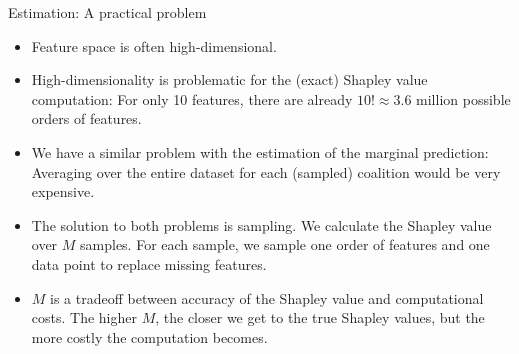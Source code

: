 \documentclass[11pt,compress,t,notes=noshow, aspectratio=169, xcolor=table]{beamer}
\begin{document}
\begin{vbframe}{Estimation: A practical problem}
  \begin{itemize}
  \itemsep1em
      \item Feature space is often high-dimensional.
      \item High-dimensionality is problematic for the (exact) Shapley value computation: For only 10 features, there are already $10! \approx 3.6$ million possible orders of features.
      \item We have a similar problem with the estimation of the marginal prediction: Averaging over the entire dataset for each (sampled) coalition would be very expensive.
      \item The solution to both problems is sampling. We calculate the Shapley value over $M$ samples. For each sample, we sample one order of features and one data point to replace missing features.
      \item $M$ is a tradeoff between accuracy of the Shapley value and computational costs. The higher $M$, the closer we get to the true Shapley values, but the more costly the computation becomes.
  \end{itemize}
\end{vbframe}

\newcommand{\xk}{\mathbf{x}^{(k)}}
\end{document}
